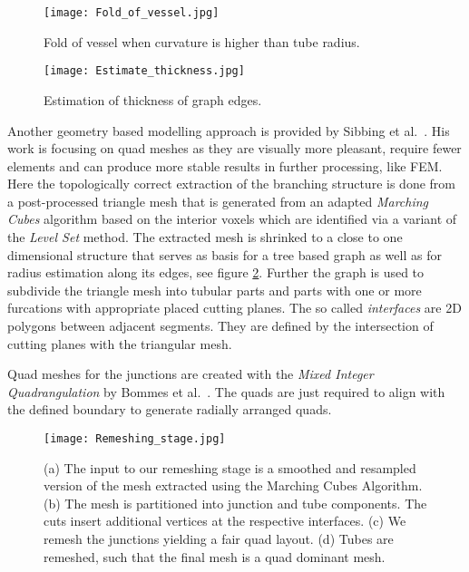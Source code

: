 \begin{figure}[h]
	\centering
	\texttt{[image: Fold\_of\_vessel.jpg]} \\
	\caption{Fold of vessel when curvature is higher than tube radius.}
	\cite{volkau2005geometric}
	\label{fig:Fold_of_vessel}
\end{figure}

\begin{figure}[h]
	\centering
	\texttt{[image: Estimate\_thickness.jpg]} \\
	\caption{Estimation of thickness of graph edges.}
	\cite{sibbing2012topology}
	\label{fig:Estimate_thickness}
\end{figure}

Another geometry based modelling approach is provided by Sibbing et al.~\cite{sibbing2012topology}.
His work is focusing on quad meshes as they are visually more pleasant, require fewer elements and can produce more stable results in further processing, like FEM. Here the topologically correct extraction of the branching structure is done from a post-processed triangle mesh that is generated from an adapted \emph{Marching Cubes} algorithm based on the interior voxels which are identified via a variant of the \emph{Level Set} method. The extracted mesh is shrinked to a close to one dimensional structure that serves as basis for a tree based graph as well as for radius estimation along its edges, see figure \ref{fig:Estimate_thickness}. Further the graph is used to subdivide the triangle mesh into tubular parts and parts with one or more furcations with appropriate placed cutting planes. The so called \emph{interfaces} are 2D polygons between adjacent segments. They are defined by the intersection of cutting planes with the triangular mesh. 

Quad meshes for the junctions are created with the \emph{Mixed Integer Quadrangulation} by Bommes et al.~\cite{bommes2009mixed}. The quads are just required to align with the defined boundary to generate radially arranged quads.

\begin{figure}[h]
	\centering
	\texttt{[image: Remeshing\_stage.jpg]} \\
	\caption{ (a) The input to our remeshing stage is a smoothed and resampled version of the mesh extracted using the Marching Cubes Algorithm. (b) The mesh is partitioned into junction and tube components. The cuts insert additional vertices at the respective interfaces. (c) We remesh the junctions yielding a fair quad layout. (d) Tubes are remeshed, such that the final mesh is a quad dominant mesh.}
	\cite{sibbing2012topology}
	\label{fig:Remeshing_stage}
\end{figure}

